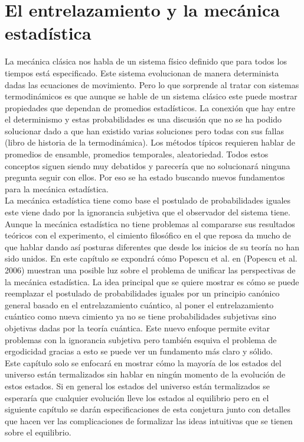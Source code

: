 \chapter{El entrelazamiento y la mecánica estadística} \label{cap:2}

La mecánica clásica nos habla de un sistema físico definido que para todos los tiempos está especificado. Este sistema evolucionan de manera determinista dadas las ecuaciones de movimiento. Pero lo que sorprende al tratar con  sistemas termodinámicos es que aunque se hable de un sistema clásico este puede mostrar propiedades que dependan de promedios estadísticos. La conexión que hay entre el determinismo y estas probabilidades es una discusión que no se ha podido solucionar dado a que han existido varias soluciones pero todas con sus fallas (libro de historia de la termodinámica). Los métodos típicos requieren hablar de promedios de ensamble, promedios temporales, aleatoriedad. Todos estos conceptos siguen siendo muy debatidos y parecería que no solucionará ninguna pregunta seguir con ellos. Por eso se ha estado buscando nuevos fundamentos para la mecánica estadística.
\\
La mecánica estadística tiene como base el postulado de probabilidades iguales este viene dado por la ignorancia subjetiva que el observador del sistema tiene. Aunque la mecánica estadística no tiene problemas al compararse sus resultados teóricos con el experimento, el cimiento filosófico en el que reposa da mucho de que hablar dando así posturas diferentes que desde los inicios de su teoría no han sido unidos. En este capítulo se expondrá cómo Popescu et al. en (Popescu et al. 2006) muestran una posible luz sobre el problema de unificar las perspectivas de la mecánica estadística. La idea principal que se quiere mostrar es cómo se puede reemplazar el postulado de probabilidades iguales por un principio canónico general basado en el entrelazamiento cuántico, al poner el entrelazamiento cuántico como nueva cimiento ya no se tiene probabilidades subjetivas sino objetivas dadas por la teoría  cuántica. Este nuevo enfoque permite evitar problemas con la ignorancia subjetiva pero también esquiva el problema de ergodicidad gracias a esto se puede ver un fundamento más claro y sólido. 
\\
Este capítulo solo se enfocará en mostrar cómo la mayoría de los estados del universo están termalizados sin hablar en ningún momento de la evolución de estos estados. Si en general los estados del universo están termalizados se esperaría que cualquier evolución lleve los estados al equilibrio pero en el siguiente capítulo se darán especificaciones de esta conjetura junto con detalles que hacen ver las complicaciones de formalizar las ideas intuitivas que se tienen sobre el equilibrio.


